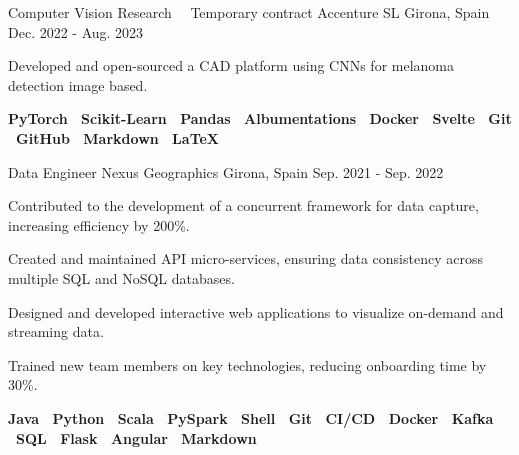 \begin{cventries}

    \cventry
    {Computer Vision Research \ \cdotp \ Temporary contract} %
    {Accenture SL} %
    {Girona, Spain} %
    {Dec. 2022 - Aug. 2023} %
    {
    \begin{cvitems}
    \item {Developed and open-sourced a CAD platform using CNNs for melanoma detection image based.}
    \item {
      \textbf{
        PyTorch \textbar \
        Scikit-Learn \textbar \
        Pandas \textbar \
        Albumentations \textbar \
        Docker \textbar \
        Svelte \textbar \
        Git \textbar \
        GitHub \textbar \
        Markdown \textbar \
        \LaTeX
     }
    }
    \end{cvitems}
    }

      \cventry
      {Data Engineer} %
      {Nexus Geographics} %
      {Girona, Spain} %
      {Sep. 2021 - Sep. 2022} %
      {
        \begin{cvitems}
        \item {Contributed to the development of a concurrent framework for data capture, increasing efficiency by 200\%.}
        \item {Created and maintained API micro-services, ensuring data consistency across multiple SQL and NoSQL databases.}
        \item {Designed and developed interactive web applications to visualize
          on-demand and streaming data.}
        \item {Trained new team members on key technologies, reducing onboarding time by 30\%.}
        \item {
          \textbf{
            Java \textbar \
            Python \textbar \
            Scala \textbar \
            PySpark \textbar \
            Shell \textbar \
            Git \textbar \
            CI/CD \textbar \
            Docker \textbar \
            Kafka \textbar \
            SQL \textbar \
            Flask \textbar \
            Angular \textbar \
            Markdown
         }
        }
        \end{cvitems}
      }



\end{cventries}

